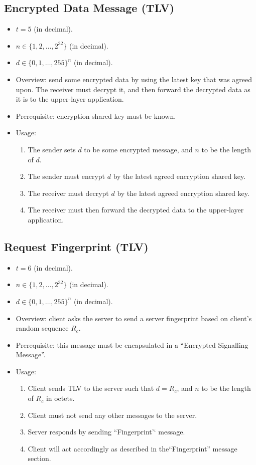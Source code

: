 \documentclass{article}
\begin{document}
\subsection{Encrypted Data Message (TLV)}
\begin{itemize}
    \item $t = 5$ (in decimal).
    \item $n \in \{1,2,\ldots,2^{32}\}$ (in decimal).
    \item $d \in \{0,1,\ldots,255\}^n$ (in decimal).
    \item Overview: send some encrypted data by using the latest key that was
    agreed upon. The receiver must decrypt it, and then forward the decrypted
    data as it is to the upper-layer application.
    \item Prerequisite: encryption shared key must be known.
    \item Usage:
        \begin{enumerate}
            \item The sender sets $d$ to be some encrypted message, and $n$ to
            be the length of $d$.
            \item The sender must encrypt $d$ by the latest agreed encryption
            shared key.
            \item The receiver must decrypt $d$ by the latest agreed encryption
            shared key.
            \item The receiver must then forward the decrypted data to the
            upper-layer application.
        \end{enumerate}
\end{itemize}

\subsection{Request Fingerprint (TLV)}
\begin{itemize}
    \item $t = 6$ (in decimal).
    \item $n \in \{1,2,\ldots,2^{32}\}$ (in decimal).
    \item $d \in \{0,1,\ldots,255\}^n$ (in decimal).
    \item Overview: client asks the server to send a server fingerprint based
    on client's random sequence $R_c$.
    \item Prerequisite: this message must be encapsulated in a ``Encrypted
    Signalling Message''.
    \item Usage:
        \begin{enumerate}
            \item Client sends TLV to the server such that $d = R_c$, and $n$
            to be the length of $R_c$ in octets.
            \item Client must not send any other messages to the server.
            \item Server responds by sending ``Fingerprint'` message.
            \item Client will act accordingly as described in
            the``Fingerprint'' message section.
        \end{enumerate}
\end{itemize}
\end{document}

